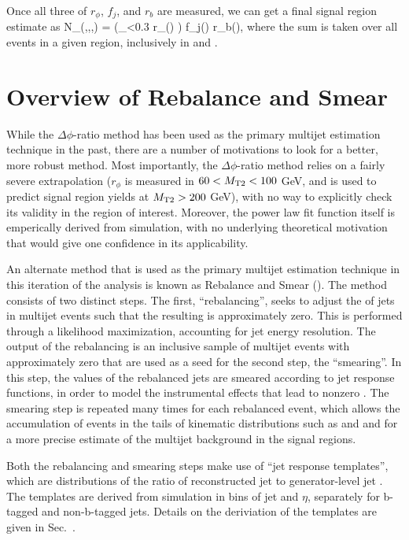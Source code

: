 Once all three of $r_\phi$, $f_j$, and $r_b$ are measured, we can get a final
signal region estimate as
\be
N_(\Ht,\njets,\nbtags,\mttwo) = \left(\sum_{\dpmin<0.3} r_\phi(\mttwo) \right) \cdot f_j(\Ht) \cdot r_b(\njets),
\ee
where the sum is taken over all events in a given \Ht region, inclusively in \njets and \nbtags.

\section{Overview of Rebalance and Smear}

While the $\Delta\phi$-ratio method has been used as the primary multijet estimation technique
in the past, there are a number of motivations to look for a better, more robust method.
Most importantly, the $\Delta\phi$-ratio method relies on a fairly severe extrapolation 
($r_\phi$ is measured in $60 < M_{\mathrm{T2}} < 100$ GeV, and is used to predict signal region 
yields at $M_{\mathrm{T2}}>200$ GeV), with no way to explicitly check its validity in the 
region of interest. Moreover, the power law fit function itself is emperically derived
from simulation, with no underlying theoretical motivation that would give one confidence
in its applicability.

An alternate method that is used as the primary multijet estimation technique in this 
iteration of the analysis is known as Rebalance and Smear (\rs).
The method consists of two distinct steps. The first, ``rebalancing'', seeks to adjust
the \pt of jets in multijet events such that the resulting \ptmiss is approximately zero.
This is performed through a likelihood maximization, accounting for jet energy resolution.
The output of the rebalancing is an inclusive sample of multijet events with approximately
zero \ptmiss that are used as a seed for the second step, the ``smearing''. In this step, the
\pt values of the rebalanced jets are smeared according to jet response functions, in order
to model the instrumental effects that lead to nonzero \ptmiss. The smearing step is repeated many
times for each rebalanced event, which allows the accumulation of events in the tails
of kinematic distributions such as \ptmiss and \mttwo and for a more precise estimate 
of the multijet background in the signal regions.

Both the rebalancing and smearing steps make use of ``jet response templates'', which are distributions
of the ratio of reconstructed jet \pt to generator-level jet \pt. The templates are derived from simulation
in bins of jet \pt and $\eta$, separately for b-tagged and non-b-tagged jets. Details on the deriviation
of the templates are given in Sec.~\cite{sec:jrt}.

